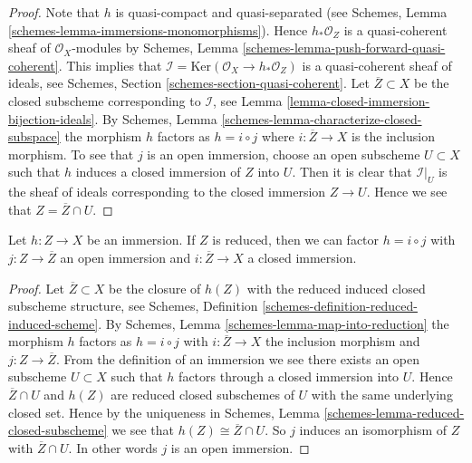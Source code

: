 \begin{proof}
Note that $h$ is quasi-compact and quasi-separated (see
Schemes, Lemma \ref{schemes-lemma-immersions-monomorphisms}).
Hence $h_*\mathcal{O}_Z$ is a quasi-coherent sheaf of $\mathcal{O}_X$-modules
by Schemes, Lemma \ref{schemes-lemma-push-forward-quasi-coherent}.
This implies that
$\mathcal{I} = \text{Ker}(\mathcal{O}_X \to h_*\mathcal{O}_Z)$
is a quasi-coherent sheaf of ideals, see
Schemes, Section \ref{schemes-section-quasi-coherent}.
Let $\overline{Z} \subset X$ be the closed subscheme corresponding
to $\mathcal{I}$, see Lemma \ref{lemma-closed-immersion-bijection-ideals}.
By Schemes, Lemma \ref{schemes-lemma-characterize-closed-subspace}
the morphism $h$ factors as
$h = i \circ j$ where $i : \overline{Z} \to X$ is the inclusion morphism.
To see that $j$ is an open immersion, choose an open subscheme
$U \subset X$ such that $h$ induces a closed immersion of $Z$
into $U$. Then it is clear that $\mathcal{I}|_U$ is the
sheaf of ideals corresponding to the closed immersion $Z \to U$.
Hence we see that $Z = \overline{Z} \cap U$.
\end{proof}

\begin{lemma}
\label{lemma-factor-reduced-immersion}
Let $h : Z \to X$ be an immersion.
If $Z$ is reduced, then we can factor
$h = i \circ j$ with $j : Z \to \overline{Z}$ an
open immersion and $i : \overline{Z} \to X$ a closed immersion.
\end{lemma}

\begin{proof}
Let $\overline{Z} \subset X$ be the closure of $h(Z)$ with the reduced
induced closed subscheme structure, see
Schemes, Definition \ref{schemes-definition-reduced-induced-scheme}.
By Schemes, Lemma \ref{schemes-lemma-map-into-reduction}
the morphism $h$ factors as
$h = i \circ j$ with $i : \overline{Z} \to X$ the inclusion morphism
and $j : Z \to \overline{Z}$. From the definition of an immersion we
see there exists an open subscheme $U \subset X$ such that
$h$ factors through a closed immersion into $U$. Hence
$\overline{Z} \cap U$ and $h(Z)$ are reduced closed subschemes
of $U$ with the same underlying closed set. Hence by the uniqueness
in Schemes, Lemma \ref{schemes-lemma-reduced-closed-subscheme}
we see that $h(Z) \cong \overline{Z} \cap U$.
So $j$ induces an isomorphism of $Z$ with $\overline{Z} \cap U$.
In other words $j$ is an open immersion.
\end{proof}



